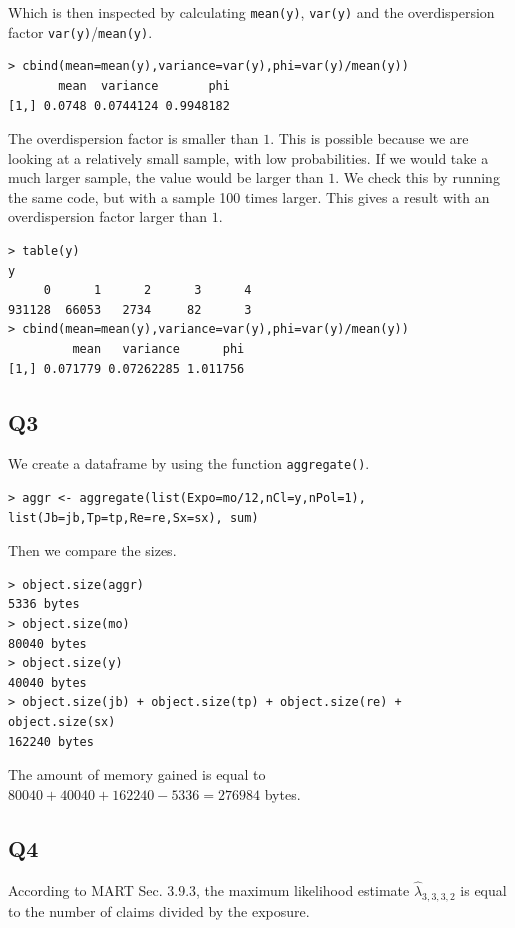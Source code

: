 \documentclass[11pt]{article}
\begin{document}
Which is then inspected by calculating \verb|mean(y)|, \verb|var(y)| and the overdispersion factor \verb|var(y)|/\verb|mean(y)|.

\begin{verbatim}
> cbind(mean=mean(y),variance=var(y),phi=var(y)/mean(y))
       mean  variance       phi
[1,] 0.0748 0.0744124 0.9948182
\end{verbatim}

The overdispersion factor is smaller than $1$. This is possible because we are looking at a relatively small sample, with low probabilities. If we would take a much larger sample, the value would be larger than $1$. We check this by running the same code, but with a sample 100 times larger. This gives a result with an overdispersion factor larger than $1$.

\begin{verbatim}
> table(y)
y
     0      1      2      3      4 
931128  66053   2734     82      3 
> cbind(mean=mean(y),variance=var(y),phi=var(y)/mean(y))
         mean   variance      phi
[1,] 0.071779 0.07262285 1.011756
\end{verbatim}

\subsection*{Q3}

We create a dataframe by using the function \verb|aggregate()|.

\begin{verbatim}
> aggr <- aggregate(list(Expo=mo/12,nCl=y,nPol=1), list(Jb=jb,Tp=tp,Re=re,Sx=sx), sum)
\end{verbatim}

Then we compare the sizes.

\begin{verbatim}
> object.size(aggr) 
5336 bytes
> object.size(mo) 
80040 bytes
> object.size(y) 
40040 bytes
> object.size(jb) + object.size(tp) + object.size(re) + object.size(sx)
162240 bytes
\end{verbatim}

The amount of memory gained is equal to $80040 + 40040 + 162240 - 5336 = 276984$ bytes.

\subsection*{Q4}

According to MART Sec. 3.9.3, the maximum likelihood estimate $\hat{\lambda}_{3,3,3,2}$ is equal to the number of claims divided by the exposure.
\end{document}
